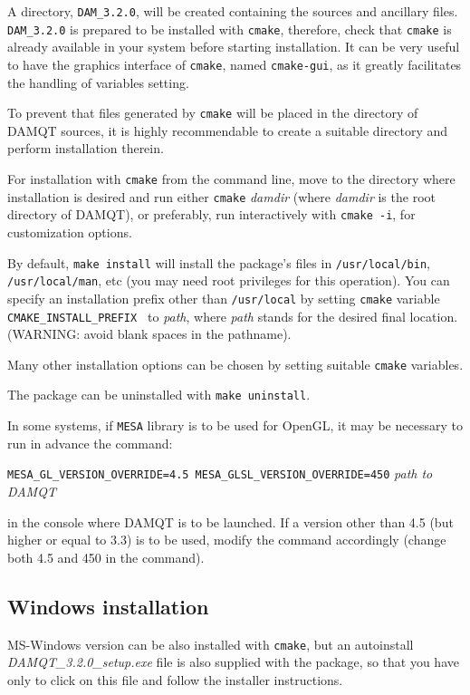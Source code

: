 \documentclass[10pt]{article}
\begin{document}
A directory, \texttt{DAM\_3.2.0}, will be created containing the sources and
ancillary files. \texttt{DAM\_3.2.0} is prepared to be installed with \texttt{cmake},
therefore, check that \texttt{cmake} is already available in your system before starting
installation. It can be very useful to have the graphics interface of 
\texttt{cmake}, named \texttt{cmake-gui}, as it greatly facilitates the handling of
variables setting.

To prevent that files generated by \texttt{cmake} will
be placed in the directory of DAMQT sources, it is highly recommendable
to create a suitable directory and perform installation therein. 

For installation with \texttt{cmake} from the command line, move to the directory
where installation is desired and run either \texttt{cmake} {\it damdir}
(where {\it damdir} is the root directory of DAMQT), or preferably, 
run interactively with \texttt{cmake -i}, for customization options.

By default, \texttt{make install}
will install the package's files in
\texttt{/usr/local/bin}, \texttt{/usr/local/man}, etc (you may need root
privileges for this operation). You can specify an
installation prefix other than \texttt{/usr/local} by setting \texttt{cmake}
variable \texttt{CMAKE\_INSTALL\_PREFIX } to {\it path}, where {\it path} stands for the
desired final location. (WARNING: avoid blank spaces in the pathname).

Many other installation options can be chosen by setting suitable  \texttt{cmake}
variables.

The package can be uninstalled with \texttt{make uninstall}.

In some systems, if \texttt{MESA} library is to be used for OpenGL, it may be 
necessary to run in advance the command:

\texttt{MESA\_GL\_VERSION\_OVERRIDE=4.5 MESA\_GLSL\_VERSION\_OVERRIDE=450} {\it path to DAMQT}

in the console where DAMQT is to be launched. If a version other than 4.5 
(but higher or equal to 3.3) is to be used, modify the command accordingly
(change both 4.5 and 450 in the command).


\subsection{Windows installation \label{sec:1.2}}

MS-Windows version can be also installed with \texttt{cmake}, but 
an autoinstall {\it DAMQT\_3.2.0\_setup.exe} file is also supplied with the package, 
so that you have only to click on this file and follow the installer instructions.
\end{document}
